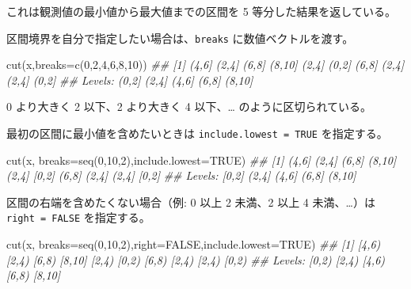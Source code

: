 \documentclass[
  letterpaper,
  xelatex,
  ja=standard, xelatex]{bxjsbook}
\newenvironment{Shaded}{\begin{snugshade}}{\end{snugshade}}
\newcommand{\AttributeTok}[1]{\textcolor[rgb]{0.40,0.45,0.13}{#1}}
\newcommand{\ConstantTok}[1]{\textcolor[rgb]{0.56,0.35,0.01}{#1}}
\newcommand{\DecValTok}[1]{\textcolor[rgb]{0.68,0.00,0.00}{#1}}
\newcommand{\DocumentationTok}[1]{\textcolor[rgb]{0.37,0.37,0.37}{\textit{#1}}}
\newcommand{\FunctionTok}[1]{\textcolor[rgb]{0.28,0.35,0.67}{#1}}
\newcommand{\NormalTok}[1]{\textcolor[rgb]{0.00,0.23,0.31}{#1}}
\begin{document}
これは観測値の最小値から最大値までの区間を 5 等分した結果を返している。

区間境界を自分で指定したい場合は、\texttt{breaks} に数値ベクトルを渡す。

\begin{Shaded}
\begin{Highlighting}[]
\FunctionTok{cut}\NormalTok{(x,}\AttributeTok{breaks=}\FunctionTok{c}\NormalTok{(}\DecValTok{0}\NormalTok{,}\DecValTok{2}\NormalTok{,}\DecValTok{4}\NormalTok{,}\DecValTok{6}\NormalTok{,}\DecValTok{8}\NormalTok{,}\DecValTok{10}\NormalTok{))}
\DocumentationTok{\#\#  [1] (4,6]  (2,4]  (6,8]  (8,10] (2,4]  (0,2]  (6,8]  (2,4]  (2,4]  (0,2] }
\DocumentationTok{\#\# Levels: (0,2] (2,4] (4,6] (6,8] (8,10]}
\end{Highlighting}
\end{Shaded}

0 より大きく 2 以下、2 より大きく 4 以下、\ldots{}
のように区切られている。

最初の区間に最小値を含めたいときは \texttt{include.lowest\ =\ TRUE}
を指定する。

\begin{Shaded}
\begin{Highlighting}[]
\FunctionTok{cut}\NormalTok{(x, }\AttributeTok{breaks=}\FunctionTok{seq}\NormalTok{(}\DecValTok{0}\NormalTok{,}\DecValTok{10}\NormalTok{,}\DecValTok{2}\NormalTok{),}\AttributeTok{include.lowest=}\ConstantTok{TRUE}\NormalTok{)}
\DocumentationTok{\#\#  [1] (4,6]  (2,4]  (6,8]  (8,10] (2,4]  [0,2]  (6,8]  (2,4]  (2,4]  [0,2] }
\DocumentationTok{\#\# Levels: [0,2] (2,4] (4,6] (6,8] (8,10]}
\end{Highlighting}
\end{Shaded}

区間の右端を含めたくない場合（例: 0 以上 2 未満、2 以上 4
未満、\ldots）は \texttt{right\ =\ FALSE} を指定する。

\begin{Shaded}
\begin{Highlighting}[]
\FunctionTok{cut}\NormalTok{(x, }\AttributeTok{breaks=}\FunctionTok{seq}\NormalTok{(}\DecValTok{0}\NormalTok{,}\DecValTok{10}\NormalTok{,}\DecValTok{2}\NormalTok{),}\AttributeTok{right=}\ConstantTok{FALSE}\NormalTok{,}\AttributeTok{include.lowest=}\ConstantTok{TRUE}\NormalTok{)}
\DocumentationTok{\#\#  [1] [4,6)  [2,4)  [6,8)  [8,10] [2,4)  [0,2)  [6,8)  [2,4)  [2,4)  [0,2) }
\DocumentationTok{\#\# Levels: [0,2) [2,4) [4,6) [6,8) [8,10]}
\end{Highlighting}
\end{Shaded}
\end{document}
